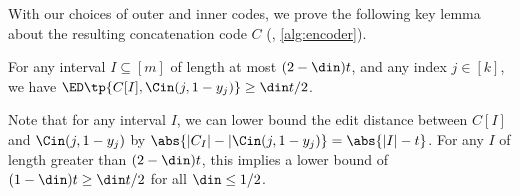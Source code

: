 With our choices of outer and inner codes, we prove the following key lemma about the resulting concatenation code $C$ (\ie, \cref{alg:encoder}).
\begin{lemma}\label{lem:self-nonsimilarity}
	For any interval $I \subseteq [m]$ of length at most $(2-\din)t$, and any index $j \in [k]$, we have $\ED\tp{C[I], \Cin(j, 1-y_j)} \ge \din t/2$.
\end{lemma}
\begin{remark}
	Note that for any interval $I$, we can lower bound the edit distance between $C[I]$ and $\Cin(j, 1-y_j)$ by $\abs{|C_I| - |\Cin(j,1-y_j)} = \abs{|I| - t}$. 
	For any $I$ of length greater than $(2-\din) t$, this implies a lower bound of $(1-\din) t \geq \din t / 2$ for all $\din \leq 1/2$.
\end{remark}
